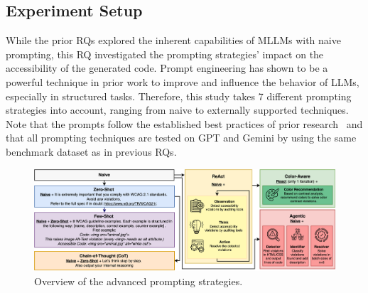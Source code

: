 \subsection{Experiment Setup}
While the prior RQs explored the inherent capabilities of MLLMs with naive
prompting, this RQ investigated the prompting strategies' impact 
on the accessibility of the generated code. Prompt engineering has shown 
to be a powerful technique in prior work to improve and influence the 
behavior of LLMs, especially in structured tasks. Therefore, this study 
takes 7 different prompting strategies into account, ranging from 
naive to externally supported techniques. Note that the prompts follow 
the established best practices of prior research~\cite{suh2025accessiblecode, xiao2024interaction2code} and
that all prompting techniques are tested on GPT and Gemini by using the 
same benchmark dataset as in previous RQs.\newline

\begin{figure}
  \centering
  \includegraphics[width=0.85\linewidth]{figures/prompts_new_new.png}
  \caption{Overview of the advanced prompting strategies.}
  \label{fig:prompts_new} 
\end{figure}


